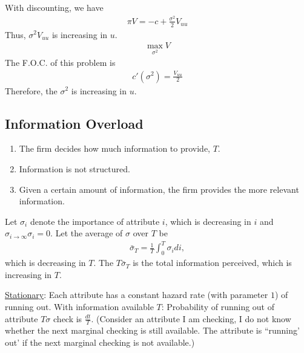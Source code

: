 \documentclass[11pt]{elegantbook}
\begin{document}
With discounting, we have
\begin{equation}
    \begin{aligned}
        \pi V = -c + \frac{\sigma^2}{2}V_{uu}
    \end{aligned}
    \nonumber
\end{equation}
Thus, $\sigma^2V_{uu}$ is increasing in $u$.
\begin{equation}
    \begin{aligned}
        \max_{\sigma^2} V
    \end{aligned}
    \nonumber
\end{equation}
The F.O.C. of this problem is
\begin{equation}
    \begin{aligned}
        c'(\sigma^2)=\frac{V_{uu}}{2}
    \end{aligned}
    \nonumber
\end{equation}
Therefore, the $\sigma^2$ is increasing in $u$.

\subsection{Information Overload}
\begin{assumption}
    \begin{enumerate}
        \item The firm decides how much information to provide, $T$.
        \item Information is not structured.
        \item Given a certain amount of information, the firm provides the more relevant information.
    \end{enumerate}
\end{assumption}
Let $\sigma_i$ denote the importance of attribute $i$, which is decreasing in $i$ and $\sigma_{i \rightarrow \infty}\sigma_i=0$. Let the average of $\sigma$ over $T$ be
\begin{equation}
    \begin{aligned}
        \bar{\sigma}_T=\frac{1}{T}\int_0^T\sigma_i d i,
    \end{aligned}
    \nonumber
\end{equation}
which is decreasing in $T$. The $T\bar{\sigma}_T$ is the total information perceived, which is increasing in $T$.

\underline{Stationary}: Each attribute has a constant hazard rate (with parameter $1$) of running out. With information available $T$: Probability of running out of attribute $T\sigma$ check is $\frac{dt}{T}$. (Consider an attribute I am checking, I do not know whether the next marginal checking is still available. The attribute is ``running' out' if the next marginal checking is not available.)
\end{document}
